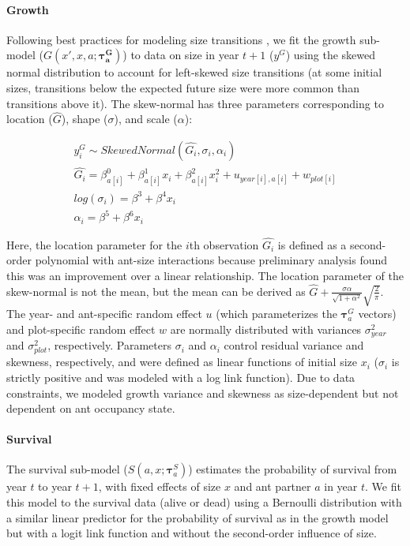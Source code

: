 \documentclass[11pt]{article}
\begin{document}
\paragraph{Growth}
Following best practices for modeling size transitions \citep{miller2025my}, we fit the growth sub-model ($G(x',x,a;\pmb{\tau^G_{a}})$) to data on size in year $t+1$ ($y^G$) using the skewed normal distribution to account for left-skewed size transitions (at some initial sizes, transitions below the expected future size were more common than transitions above it). 
The skew-normal has three parameters corresponding to location ($\hat{G}$), shape ($\sigma$), and scale ($\alpha$):
\begin{linenomath*}
	\begin{gather}
	y_i^G \sim Skewed Normal(\hat{G_i},\sigma_i,\alpha_i) \\
	\hat{G_i} = \beta^0_{a[i]} + \beta^1_{a[i]} x_i + \beta^2_{a[i]} x_i^2 + u_{year[i],a[i]} + w_{plot[i]} \\
	log(\sigma_i)  = \beta^3 + \beta^4 x_i \\
	\alpha_i = \beta^5 + \beta^6 x_i
	\label{eqn:growth}
	\end{gather}
\end{linenomath*}
Here, the location parameter for the $i$th observation $\hat{G_i}$ is defined as a second-order polynomial with ant-size interactions because preliminary analysis found this was an improvement over a linear relationship.
The location parameter of the skew-normal is not the mean, but the mean can be derived as $\hat{G} + \frac{\sigma\alpha}{\sqrt{1+\alpha^2}} \sqrt{\frac{2}{\pi}}$. 
The year- and ant-specific random effect $u$ (which parameterizes the $\pmb{\tau}^G_{a}$ vectors) and plot-specific random effect $w$ are normally distributed with variances $\sigma^2_{year}$ and $\sigma^2_{plot}$, respectively. 
Parameters $\sigma_i$ and $\alpha_i$  control residual variance and skewness, respectively, and were defined as linear functions of initial size $x_i$ ($\sigma_i$ is strictly positive and was modeled with a log link function). 
Due to data constraints, we modeled growth variance and skewness as size-dependent but not dependent on ant occupancy state. 

\paragraph{Survival}
The survival sub-model ($S(a,x;\pmb{\tau}_{a}^{S})$) estimates the probability of survival from year $t$ to year $t+1$, with fixed effects of size $x$ and ant partner $a$ in year $t$.
We fit this model to the survival data (alive or dead) using a Bernoulli distribution with a similar linear predictor for the probability of survival as in the growth model but with a logit link function and without the second-order influence of size.
\end{document}
